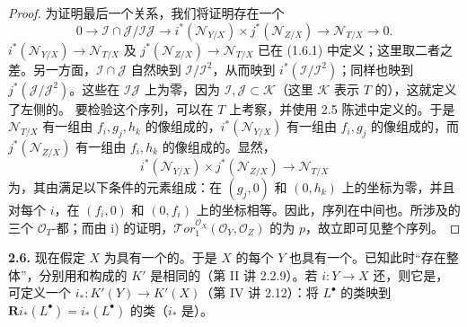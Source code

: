 \begin{proof}
为证明最后一个关系，我们将证明存在一个
\[
0\longrightarrow\mathcal I\cap\mathcal J/\mathcal I\mathcal J
\longrightarrow i^*(\mathcal N_{Y/X})\times j^*(\mathcal N_{Z/X})
\longrightarrow\mathcal N_{T/X}\longrightarrow0.
\]
 $i^*(\mathcal N_{Y/X})\to\mathcal N_{T/X}$ 及 $j^*(\mathcal N_{Z/X})\to\mathcal N_{T/X}$ 已在 (1.6.1) 中定义；这里取二者之差。另一方面，$\mathcal I\cap\mathcal J$ 自然映到 $\mathcal I/\mathcal I^2$，从而映到 $i^*(\mathcal I/\mathcal I^2)$；同样也映到 $j^*(\mathcal J/\mathcal J^2)$。这些在 $\mathcal I\mathcal J$ 上为零，因为 $\mathcal I,\mathcal J\subset\mathcal K$（这里 $\mathcal K$ 表示 $T$ 的），这就定义了左侧的。
要检验这个序列，可以在 $T$ 上考察，并使用 2.5 陈述中定义的。于是 $\mathcal N_{T/X}$ 有一组由 $f_i,g_j,h_k$ 的像组成的，$i^*(\mathcal N_{Y/X})$ 有一组由 $f_i,g_j$ 的像组成的，而 $j^*(\mathcal N_{Z/X})$ 有一组由 $f_i,h_k$ 的像组成的。显然，
\[
i^*(\mathcal N_{Y/X})\times j^*(\mathcal N_{Z/X})\longrightarrow\mathcal N_{T/X}
\]
为，其由满足以下条件的元素组成：在 $(g_j,0)$ 和 $(0,h_k)$ 上的坐标为零，并且对每个 $i$，在 $(f_i,0)$ 和 $(0,f_i)$ 上的坐标相等。因此，序列在中间也。所涉及的三个 $\mathcal O_T$-都；而由 i) 的证明，$\mathcal{T}or_1^{\mathcal O_X}(\mathcal O_Y,\mathcal O_Z)$ 的为 $p$，故立即可见整个序列。
\end{proof}

\textbf{2.6.} 现在假定 $X$ 为具有一个的。于是 $X$ 的每个 $Y$ 也具有一个。已知此时“存在整体”，分别用和构成的 $K'$ 是相同的（第 II 讲 2.2.9）。若 $i:Y\to X$ 还，则它是，可定义一个 $i_*:K'(Y)\to K'(X)$（第 IV 讲 2.12）：将 $L^\bullet$ 的类映到 $\mathbf R i_*(L^\bullet)=i_*(L^\bullet)$ 的类（$i_*$ 是）。

